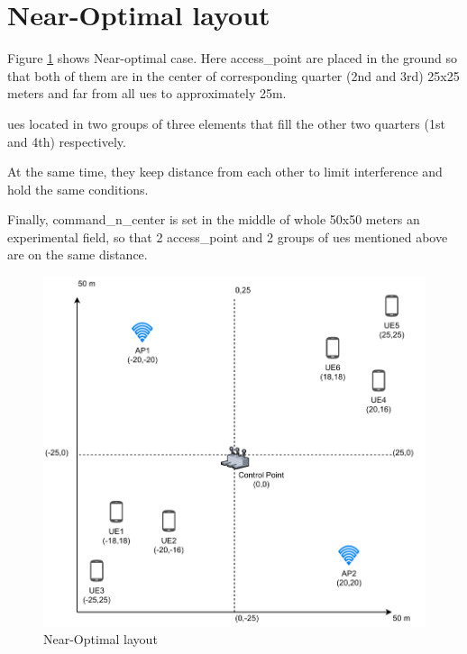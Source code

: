 \section{Near-Optimal layout}\label{near-optimal-layout}

Figure \ref{fig:near-optimal-layout} shows Near-optimal case. Here \acrshort{access_point} are placed in the ground
so that both of them are in the center of corresponding quarter (2nd and 3rd) 25x25 meters and far from all \glspl{ue} to approximately 25m.

\glspl{ue} located in two groups of three elements that fill the other two
quarters (1st and 4th) respectively.

At the same time, they keep distance from each other to limit interference and hold the same conditions.

Finally, \gls{command_n_center} is set in the middle of whole 50x50 meters an
experimental field, so that 2 \acrshort{access_point} and 2 groups of \glspl{ue} mentioned above are on the same distance.

\begin{figure}[H]
	\centering
	\includegraphics[width=\linewidth,keepaspectratio]{images/05-cases-description-Near-Optimal.pdf}
\caption{Near-Optimal layout}
\label{fig:near-optimal-layout}
\end{figure}
